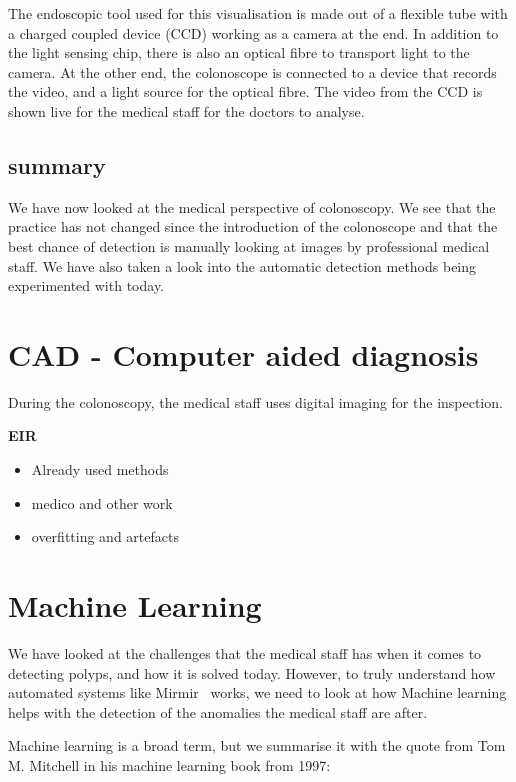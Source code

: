 The endoscopic tool used for this visualisation is made out of a flexible tube with a charged coupled device (CCD) working as a camera at the end. In addition to the light sensing chip, there is also an optical fibre to transport light to the camera. At the other end, the colonoscope is connected to a device that records the video, and a light source for the optical fibre. The video from the CCD is shown live for the medical staff for the doctors to analyse. \cite{Colonoscope}


\subsection{summary}
We have now looked at the medical perspective of colonoscopy. We see that the practice has not changed since the introduction of the colonoscope and that the best chance of detection is manually looking at images by professional medical staff. We have also taken a look into the automatic detection methods being experimented with today.


\section{CAD - Computer aided diagnosis}
\label{cha:CAD}
During the colonoscopy, the medical staff uses digital imaging for the inspection. 

\textbf{EIR}


\begin{itemize}
    \item Already used methods
    \item medico and other work
    \item overfitting and artefacts
\end{itemize}

    

\section{Machine Learning}
We have looked at the challenges that the medical staff has when it comes to detecting polyps, and how it is solved today.
However, to truly understand how automated systems like Mirmir~\cite{Steven2018MimirPaper}  works, we need to look at how Machine learning helps with the detection of the anomalies the medical staff are after.  

Machine learning is a broad term, but we summarise it with the quote from  Tom M. Mitchell in his machine learning book from 1997:\\
\vspace{10px}

